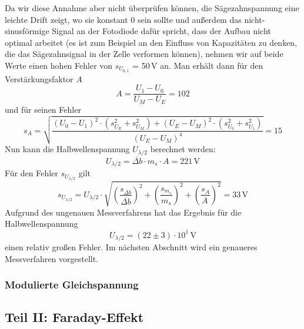 Da wir diese Annahme aber nicht überprüfen können,
die Sägezahnspannung eine leichte Drift zeigt, wo sie konstant 0 sein sollte
und außerdem das nicht-sinusförmige
Signal an der Fotodiode dafür spricht, dass der Aufbau nicht optimal arbeitet
(es ist zum Beispiel an den Einfluss von Kapazitäten zu denken,
die das Sägezahnsignal in der Zelle verformen können),
nehmen wir auf beide Werte einen hohen Fehler von $s_{U_{0,1}}$ = 50\,V an.
Man erhält dann für den Verstärkungsfaktor $A$
\begin{equation}
  A=\frac{U_1-U_0}{U_M-U_E}=102
\end{equation}
und für seinen Fehler
\begin{equation}
  s_A=\sqrt{\frac{(U_0-U_1)^2 \cdot \left(s_{U_E}^2+s_{U_M}^2\right)+(U_E-U_M)^2 \cdot \left(s_{U_0}^2+s_{U_1}^2\right)}{(U_E-U_M)^4}}
  =15
\end{equation}
Nun kann die Halbwellenspannung $U_{\lambda / 2}$ berechnet werden:
\begin{equation}
  U_{\lambda / 2}  = \overline{\Delta b} \cdot m_s \cdot A = 221\,\text{V}
\end{equation}
Für den Fehler $s_{U_{\lambda / 2}}$ gilt
\begin{equation}
  s_{U_{\lambda / 2}} = U_{\lambda / 2} \cdot \sqrt{\left(\frac{s_{\overline{\Delta b}}}{\overline{\Delta b}}\right)^2+\left(\frac{s_{m_s}}{m_s}\right)^2+\left(\frac{s_{A}}{A_{\,}}\right)^2}
  = 33 \,\text{V}
\end{equation}
Aufgrund des ungenauen Messverfahrens hat das Ergebnis für die Halbwellenspannung
\begin{equation}
  U_{\lambda / 2}  = (22 \pm 3) \cdot 10^1\,\text{V}
\end{equation}
einen relativ großen Fehler.
Im nächsten Abschnitt wird ein genaueres Messverfahren vorgestellt.


\subsubsection{Modulierte Gleichspannung}

\subsection{Teil II: Faraday-Effekt}
